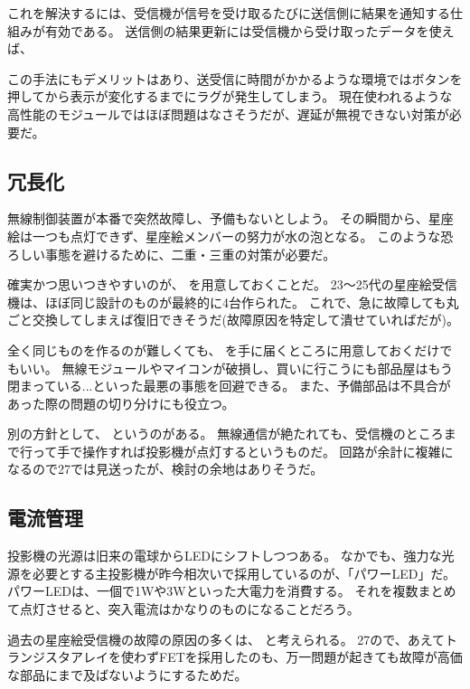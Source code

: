 \documentclass[letterpaper,10pt,dvipdfmx]{sphinxmanual}
\begin{document}
これを解決するには、受信機が信号を受け取るたびに送信側に結果を通知する仕組みが有効である。
送信側の結果更新には受信機から受け取ったデータを使えば、

この手法にもデメリットはあり、送受信に時間がかかるような環境ではボタンを押してから表示が変化するまでにラグが発生してしまう。
現在使われるような高性能のモジュールではほぼ問題はなさそうだが、遅延が無視できない対策が必要だ。


\subsection{冗長化}
\label{\detokenize{wireless/wireless:id14}}
無線制御装置が本番で突然故障し、予備もないとしよう。
その瞬間から、星座絵は一つも点灯できず、星座絵メンバーの努力が水の泡となる。
このような恐ろしい事態を避けるために、二重・三重の対策が必要だ。

確実かつ思いつきやすいのが、 を用意しておくことだ。
23〜25代の星座絵受信機は、ほぼ同じ設計のものが最終的に4台作られた。
これで、急に故障しても丸ごと交換してしまえば復旧できそうだ(故障原因を特定して潰せていればだが)。

全く同じものを作るのが難しくても、
を手に届くところに用意しておくだけでもいい。
無線モジュールやマイコンが破損し、買いに行こうにも部品屋はもう閉まっている...といった最悪の事態を回避できる。
また、予備部品は不具合があった際の問題の切り分けにも役立つ。

別の方針として、 というのがある。
無線通信が絶たれても、受信機のところまで行って手で操作すれば投影機が点灯するというものだ。
回路が余計に複雑になるので27では見送ったが、検討の余地はありそうだ。


\subsection{電流管理}
\label{\detokenize{wireless/wireless:id15}}
投影機の光源は旧来の電球からLEDにシフトしつつある。
なかでも、強力な光源を必要とする主投影機が昨今相次いで採用しているのが、「パワーLED」だ。
パワーLEDは、一個で1Wや3Wといった大電力を消費する。
それを複数まとめて点灯させると、突入電流はかなりのものになることだろう。

過去の星座絵受信機の故障の原因の多くは、
と考えられる。
27ので、あえてトランジスタアレイを使わずFETを採用したのも、万一問題が起きても故障が高価な部品にまで及ばないようにするためだ。
\end{document}
